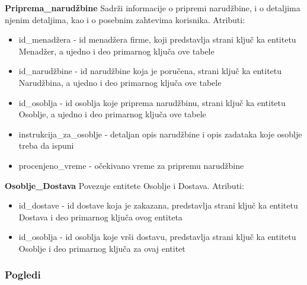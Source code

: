 \documentclass[a4paper]{article}
\begin{document}
\vspace{3mm}

\textbf{Priprema\_narudžbine} Sadrži informacije o pripremi narudžbine, i o detaljima njenim detaljima, kao i o posebnim zahtevima korisnika. Atributi:
\begin{itemize}
    \item id\_menadžera - id menadžera firme, koji predstavlja strani ključ ka entitetu Menadžer, a ujedno i deo primarnog ključa ove tabele
    \item id\_narudžbine - id narudžbine koja je poručena, strani ključ ka entitetu Narudžbina, a ujedno i deo primarnog ključa ove tabele
    \item id\_osoblja - id osoblja koje priprema narudžbinu, strani ključ ka entitetu Osoblje, a ujedno i deo primarnog ključa ove tabele
    \item instrukcija\_za\_osoblje - detaljan opis narudžbine i opis zadataka koje osoblje treba da ispuni
    \item procenjeno\_vreme - očekivano vreme za pripremu narudžbine
    
\end{itemize}

\vspace{3mm}

\textbf{Osoblje\_Dostava} Povezuje entitete Osoblje i Dostava. Atributi:
\begin{itemize}
    \item id\_dostave - id dostave koja je zakazana, predstavlja strani ključ ka entitetu Dostava i deo primarnog ključa ovog entiteta
    \item id\_osoblja - id osoblja koje vrši dostavu, predstavlja strani ključ ka entitetu Osoblje i deo primarnog ključa za ovaj entitet
    
\end{itemize}

\vspace{3mm}


\subsubsection{Pogledi}
\end{document}
